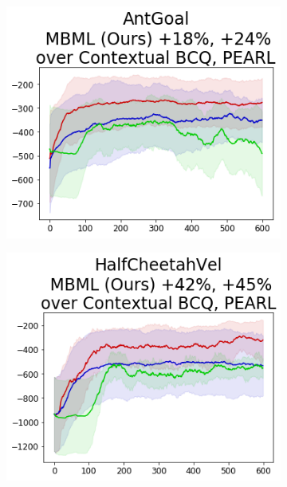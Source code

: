 \begin{figure}[!t]
\begin{minipage}{0.69\textwidth}
{            \begin{subfigure}{\mujocobaselinefigsize\paperwidth}
                \includegraphics[width=\linewidth]{chapter_2/fig/wd-AntGoal.png}
            \end{subfigure}

            \begin{subfigure}{\mujocobaselinefigsize\paperwidth}
                \includegraphics[width=\linewidth]{chapter_2/fig/wd-HalfCheetahVel.png}
            \end{subfigure}}


\end{minipage}
\end{figure}
